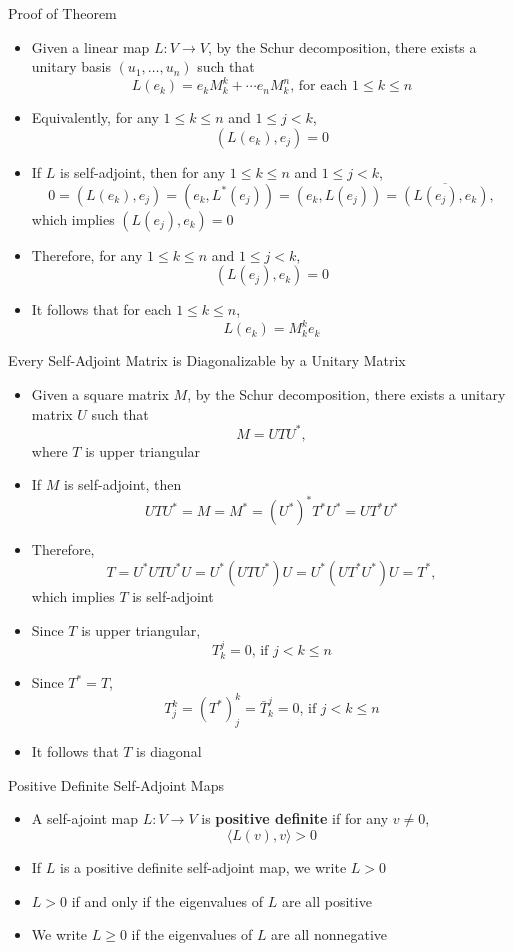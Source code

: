 \documentclass[usenames,dvipsnames,10pt]{beamer}
\begin{document}
\begin{frame}
  {Proof of Theorem}

  \begin{itemize}
  \item Given a linear map $L: V \rightarrow V$, by the Schur decomposition, there exists a unitary basis $(u_1, \dots, u_n)$ such that
    \[
      L(e_k) = e_kM_k^k + \cdots e_nM_k^n\text{, for each }1 \le k \le n
    \]
  \item Equivalently, for any $1 \le k \le n$ and $1 \le j < k$,
    \[
      (L(e_k),e_j) = 0
    \]
  \item If $L$ is self-adjoint, then for any $1 \le k \le n$ and $1 \le j < k$,
    \[
      0 = (L(e_k),e_j) = (e_k,L^*(e_j)) = (e_k,L(e_j)) = \overline{(L(e_j),e_k)},
    \]
    which implies $(L(e_j),e_k) = 0$
  \item Therefore, for any $1 \le k \le n$ and $1 \le j < k$,
    \[
      (L(e_j),e_k) = 0
    \]
  \item It follows that for each $1 \le k \le n$,
    \[
      L(e_k) = M^k_ke_k
    \]
  \end{itemize}
\end{frame}

\begin{frame}
  {Every Self-Adjoint Matrix is Diagonalizable by a Unitary Matrix}

  \begin{itemize}
  \item Given a square matrix $M$, by the Schur decomposition, there exists a unitary matrix $U$ such that
    \[ M = UTU^*, \]
    where $T$ is upper triangular
  \item If $M$ is self-adjoint, then
    \[ UTU^* = M = M^* = (U^*)^*T^*U^* = UT^*U^* \]
  \item Therefore,
    \[ T = U^*UTU^*U = U^*(UTU^*)U = U^*(UT^*U^*)U = T^*, \]
    which implies $T$ is self-adjoint
  \item Since $T$ is upper triangular,
    \[ T^j_k = 0\text{, if }j < k \le n \]
  \item Since $T^* = T$,
    \[ T^k_j = (T^*)^k_j = \bar{T}^j_k = 0\text{, if }j < k \le n \]
  \item It follows that $T$ is diagonal
  \end{itemize}
\end{frame}

\begin{frame}
  {Positive Definite Self-Adjoint Maps}

  \begin{itemize}
  \item A self-ajoint map $L: V \rightarrow V$ is {\bf positive definite} if for any $v \ne 0$,
    \[
      \langle L(v),v\rangle > 0
    \]
  \item If $L$ is a positive definite self-adjoint map, we write $L > 0$
  \item $L > 0$ if and only if the eigenvalues of $L$ are all positive
  \item We write $L \ge 0$ if the eigenvalues of $L$ are all nonnegative
  \end{itemize}
\end{frame}
\end{document}

